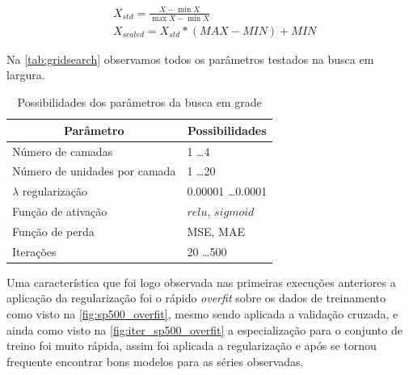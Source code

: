 \documentclass[
    12pt,
    oneside,
    a4paper,
    english,
    brazil
]{abntex2}
\begin{document}
\begin{align}\label{eq:minmaxscaler}
    &X_{std} = \frac{X - \min X}{\max X-\min X}\\
    &X_{scaled} = X_{std} * (MAX-MIN)+MIN
\end{align}

Na \autoref{tab:gridsearch} observamos todos os parâmetros testados na busca em
largura.

\begin{table}[ht]
\centering
\caption{Possibilidades dos parâmetros da busca em grade}\label{tab:gridsearch}
\begin{tabular}{l l}
\multicolumn{1}{c}{Parâmetro}        & \multicolumn{1}{c}{Possibilidades}  \\
    \toprule
    Número de camadas                & 1 \ldots 4                          \\
    Número de unidades por camada    & 1 \ldots 20                         \\
    $\lambda$ regularização          & 0.00001 \ldots 0.0001               \\
    Função de ativação               & $relu$, $sigmoid$                   \\
    Função de perda                  & MSE, MAE                            \\
    Iterações                        & 20 \ldots 500
\end{tabular}
\end{table}

Uma característica que foi logo  observada nas primeiras execuções anteriores a
aplicação  da regularização  foi o  rápido \textit{overfit}  sobre os  dados de
treinamento como  visto na \autoref{fig:sp500_overfit}, mesmo  sendo aplicada a
validação  cruzada, e  ainda como  visto na  \autoref{fig:iter_sp500_overfit} a
especialização para o conjunto de treino foi muito rápida, assim foi aplicada a
regularização e após se tornou frequente  encontrar bons modelos para as séries
observadas.
\end{document}
